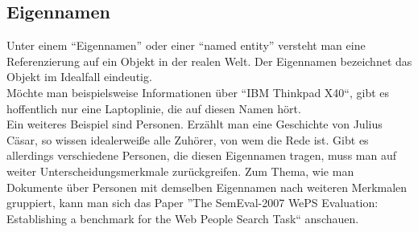 \subsection{Eigennamen}
Unter einem ``Eigennamen'' oder einer ``named entity'' versteht man eine Referenzierung auf ein Objekt in der realen Welt. Der Eigennamen bezeichnet das Objekt im Idealfall eindeutig.\\
Möchte man beispielsweise Informationen über ``IBM Thinkpad X40``, gibt es hoffentlich nur eine Laptoplinie, die auf diesen Namen hört.\\
Ein weiteres Beispiel sind Personen. Erzählt man eine Geschichte von Julius Cäsar, so wissen idealerweiße alle Zuhörer, von wem die Rede ist. Gibt es allerdings verschiedene Personen, die diesen Eigennamen tragen, muss man auf weiter Unterscheidungsmerkmale zurückgreifen. Zum Thema, wie man Dokumente über Personen mit demselben Eigennamen nach weiteren Merkmalen gruppiert, kann man sich das Paper ''The SemEval-2007 WePS Evaluation: Establishing a benchmark for the Web People Search Task``\cite{paper:Artiles} anschauen.

